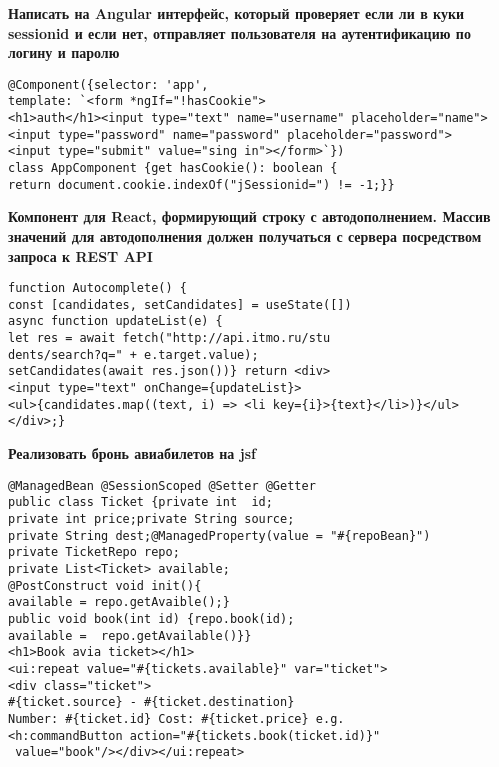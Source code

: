 \documentclass{article}
\begin{document}
\begin{minipage}[t]{0.3\textwidth}
    \textbf{Написать на Angular интерфейс, который проверяет если ли в куки sessionid и если нет, отправляет пользователя на аутентификацию по логину и паролю}
    \begin{lstlisting}[frame=single, basicstyle=\tiny\ttfamily, breaklines=true, breakatwhitespace=true, postbreak=\mbox{\textcolor{red}{$\hookrightarrow$}\space}]
@Component({selector: 'app',
template: `<form *ngIf="!hasCookie">
<h1>auth</h1><input type="text" name="username" placeholder="name">
<input type="password" name="password" placeholder="password">
<input type="submit" value="sing in"></form>`})
class AppComponent {get hasCookie(): boolean {
return document.cookie.indexOf("jSessionid=") != -1;}}
    \end{lstlisting}
\end{minipage}%
\hfill
\begin{minipage}[t]{0.3\textwidth}
    \textbf{Компонент для React, формирующий строку с автодополнением. Массив значений для автодополнения должен получаться с сервера посредством запроса к REST API}
    \begin{lstlisting}[frame=single, basicstyle=\tiny\ttfamily, breaklines=true, breakatwhitespace=true, postbreak=\mbox{\textcolor{red}{$\hookrightarrow$}\space}]
function Autocomplete() {
const [candidates, setCandidates] = useState([])
async function updateList(e) {
let res = await fetch("http://api.itmo.ru/stu
dents/search?q=" + e.target.value);
setCandidates(await res.json())} return <div>
<input type="text" onChange={updateList}>
<ul>{candidates.map((text, i) => <li key={i}>{text}</li>)}</ul></div>;}
    \end{lstlisting}
\end{minipage}%
\hfill
\begin{minipage}[t]{0.3\textwidth}
    \textbf{Реализовать бронь авиабилетов на jsf}
    \begin{lstlisting}[frame=single, basicstyle=\tiny\ttfamily, breaklines=true, breakatwhitespace=true, postbreak=\mbox{\textcolor{red}{$\hookrightarrow$}\space}]
@ManagedBean @SessionScoped @Setter @Getter
public class Ticket {private int  id;     
private int price;private String source;     
private String dest;@ManagedProperty(value = "#{repoBean}")
private TicketRepo repo;  
private List<Ticket> available;
@PostConstruct void init(){
available = repo.getAvaible();}
public void book(int id) {repo.book(id); 
available =  repo.getAvailable()}}
<h1>Book avia ticket></h1>
<ui:repeat value="#{tickets.available}" var="ticket">
<div class="ticket">
#{ticket.source} - #{ticket.destination}
Number: #{ticket.id} Cost: #{ticket.price} e.g.
<h:commandButton action="#{tickets.book(ticket.id)}"
 value="book"/></div></ui:repeat>
    \end{lstlisting}
\end{minipage}%
\\
\end{document}
